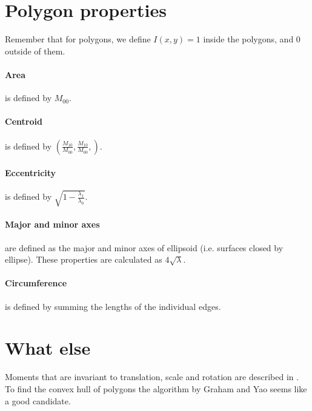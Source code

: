 \documentclass{article}
\begin{document}
\section{Polygon properties}
Remember that for polygons, we define $I(x,y)=1$ inside the polygons, and $0$ outside of them.
\paragraph{Area} is defined by $M_{00}$.
\paragraph{Centroid} is defined by $\left(\frac{M_{10}}{M_{00}}, \frac{M_{10}}{M_{00}}, \right)$.
\paragraph{Eccentricity} is defined by $\sqrt{1-\frac{\lambda_1}{\lambda_0}}$.
\paragraph{Major and minor axes} are defined as the major and minor axes of ellipsoid (i.e. surfaces closed by ellipse). These properties are calculated as $4\sqrt{\lambda}$.
\paragraph{Circumference} is defined by summing the lengths of the individual edges.

\section{What else}
Moments that are invariant to translation, scale and rotation are described in \cite{hu1962visual}. To find the convex hull of polygons the algorithm by Graham and Yao \cite{graham1983finding} seems like a good candidate.

\printbibliography
\end{document}
